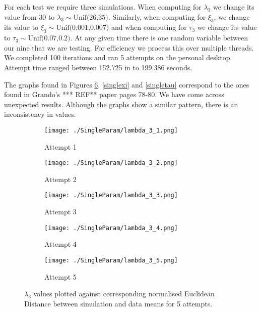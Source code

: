         For each test we require three simulations. When computing for $\lambda_3$ we change its value from 30 to $\lambda_3 \sim \text{Unif(26,35)}$. Similarly, when computing for $\xi_3$, we change its value to $\xi_3 \sim \text{Unif(0.001,0.007)}$ and when computing for $\tau_3$ we change its value to $\tau_3 \sim \text{Unif(0.07,0.2)}$. At any given time there is one random variable between our nine that we are testing. For efficiency we process this over multiple threads. We completed 100 iterations and ran 5 attempts on the personal desktop. Attempt time ranged between 152.725 in to 199.386 seconds.

        The graphs found in Figures \ref{singlelam}, \ref{singlexi} and \ref{singletau} correspond to the ones found in Grando’s *** REF** paper pages 78-80. We have come across unexpected results. Although the graphs show a similar pattern, there is an inconsistency in values. 


        \begin{figure}
            \begin{subfigure}{.3\textwidth}
            \centering
            \texttt{[image: ./SingleParam/lambda\_3\_1.png]}
            \caption{Attempt 1}
            \label{singlelam:1}
            \end{subfigure}
            \begin{subfigure}{.3\textwidth}
            \centering
            \texttt{[image: ./SingleParam/lambda\_3\_2.png]}
            \caption{Attempt 2}
            \label{singlelam:2}
            \end{subfigure}
            \begin{subfigure}{.3\textwidth}
                \centering
                \texttt{[image: ./SingleParam/lambda\_3\_3.png]}
                \caption{Attempt 3}
                \label{singlelam:3}
            \end{subfigure}

            \centering
            \begin{subfigure}{.3\textwidth} 
                \centering
                \texttt{[image: ./SingleParam/lambda\_3\_4.png]}
                \caption{Attempt 4}
                \label{singlelam:4}
            \end{subfigure}
            \begin{subfigure}{.3\textwidth}
                \centering
                \texttt{[image: ./SingleParam/lambda\_3\_5.png]}
                \caption{Attempt 5}
                \label{singlelam:5}
            \end{subfigure}

            \caption{$\lambda_3$ values plotted against corresponding normalised Euclidean Distance between simulation and data means for 5 attempts.}
            \label{singlelam}
        \end{figure}

